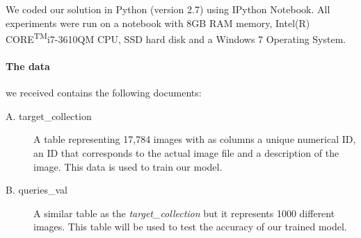 
We coded our solution in Python (version 2.7) using IPython Notebook. All experiments were run on a notebook with 8GB RAM memory, Intel(R) CORE\textsuperscript{TM}i7-3610QM CPU, SSD hard disk and a Windows 7 Operating System.

\paragraph{The data}
we received contains the following documents:
\begin{description}
	\item[A. target\_collection] A table representing 17,784 images with as columns a unique numerical ID, an ID that corresponds to the actual image file and a description of the image. This data is used to train our model.
	\item[B. queries\_val] A similar table as the \textit{target\_collection} but it represents 1000 different images. This table will be used to test the accuracy of our trained model.
\end{description}